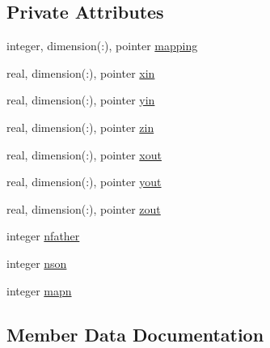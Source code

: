 \subsection*{Private Attributes}
\begin{DoxyCompactItemize}
\item 
integer, dimension(\+:), pointer \mbox{\hyperlink{structmoduleinterpolategrids_1_1t__fillingcells_a3021bcae09c52d6aa2a50eec1379b61d}{mapping}}
\item 
real, dimension(\+:), pointer \mbox{\hyperlink{structmoduleinterpolategrids_1_1t__fillingcells_a43bba52faf26a0cc239b9d404b73eced}{xin}}
\item 
real, dimension(\+:), pointer \mbox{\hyperlink{structmoduleinterpolategrids_1_1t__fillingcells_abac303c911bcef2818fa1a7eb59cb675}{yin}}
\item 
real, dimension(\+:), pointer \mbox{\hyperlink{structmoduleinterpolategrids_1_1t__fillingcells_afd6aa60fed33fd0281226d08063d38e6}{zin}}
\item 
real, dimension(\+:), pointer \mbox{\hyperlink{structmoduleinterpolategrids_1_1t__fillingcells_ae568c9884aecf69cf3b8d336446f730e}{xout}}
\item 
real, dimension(\+:), pointer \mbox{\hyperlink{structmoduleinterpolategrids_1_1t__fillingcells_a7c3097a321a1f7b856866734110bc333}{yout}}
\item 
real, dimension(\+:), pointer \mbox{\hyperlink{structmoduleinterpolategrids_1_1t__fillingcells_af8b2ef10bf80526bdc32e7572c4cc9fc}{zout}}
\item 
integer \mbox{\hyperlink{structmoduleinterpolategrids_1_1t__fillingcells_a5e92b444429f4b9cfd6555ed729cd58b}{nfather}}
\item 
integer \mbox{\hyperlink{structmoduleinterpolategrids_1_1t__fillingcells_a5173c3538a13074318a634d680a9f6e4}{nson}}
\item 
integer \mbox{\hyperlink{structmoduleinterpolategrids_1_1t__fillingcells_ad3dce412dda36b0df7cf0d0e53d55593}{mapn}}
\end{DoxyCompactItemize}


\subsection{Member Data Documentation}
\mbox{\label{structmoduleinterpolategrids_1_1t__fillingcells_ad3dce412dda36b0df7cf0d0e53d55593}} 

